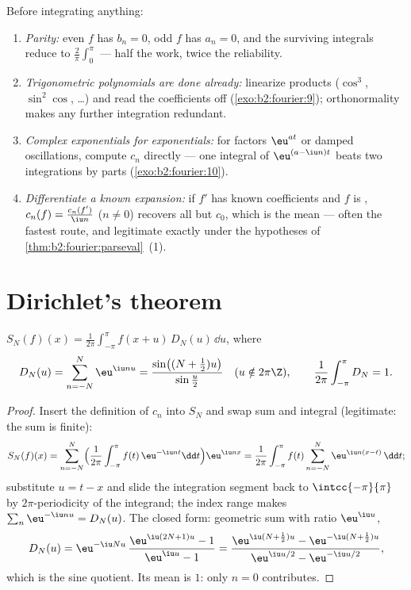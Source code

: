 \begin{method}\label{met:b2:fourier:coefficients}
Before integrating anything:
\begin{enumerate}
  \item \emph{Parity:} even $f$ has $b_n = 0$, odd $f$ has $a_n
        = 0$, and the surviving integrals reduce to $\frac2\pi
        \int_0^\pi$ --- half the work, twice the reliability.
  \item \emph{Trigonometric polynomials are done already:}
        linearize products ($\cos^3$, $\sin^2\cos$, \dots) and
        read the coefficients off
        (\cref{exo:b2:fourier:9}); orthonormality makes any
        further integration redundant.
  \item \emph{Complex exponentials for exponentials:} for
        factors $\eu^{at}$ or damped oscillations, compute
        $c_n$ directly --- one integral of $\eu^{(a - \iu
        n)t}$ beats two integrations by parts
        (\cref{exo:b2:fourier:10}).
  \item \emph{Differentiate a known expansion:} if $f' $ has
        known coefficients and $f$ is , $c_n(f) =
        \frac{c_n(f')}{\iu n}$ ($n \neq 0$) recovers all but
        $c_0$, which is the mean --- often the fastest route,
        and legitimate exactly under the hypotheses of
        \cref{thm:b2:fourier:parseval}~(1).
\end{enumerate}
\end{method}

\section{Dirichlet's theorem}

\begin{lemma}\label{lem:b2:fourier:kernel}
$S_N(f)(x) = \frac{1}{2\pi}\int_{-\pi}^{\pi} f(x + u)\,D_N(u)\,\dd
u$, where
\[
D_N(u) = \sum_{n=-N}^{N} \eu^{\iu nu}
= \frac{\sin\bigl((N + \frac12)u\bigr)}{\sin\frac u2}
\quad (u \notin 2\pi\Z),
\qquad
\frac{1}{2\pi}\int_{-\pi}^{\pi} D_N = 1 .
\]
\end{lemma}

\begin{proof}
Insert the definition of $c_n$ into $S_N$ and swap sum and integral
(legitimate: the sum is finite):
\[
S_N(f)(x)
= \sum_{n=-N}^{N}\Bigl(\frac{1}{2\pi}\int_{-\pi}^{\pi}
f(t)\,\eu^{-\iu nt}\dd t\Bigr)\eu^{\iu nx}
= \frac{1}{2\pi}\int_{-\pi}^{\pi} f(t)
\sum_{n=-N}^{N}\eu^{\iu n(x-t)}\,\dd t ;
\]
substitute $u = t - x$ and slide the integration segment back
to $\intcc{-\pi}{\pi}$ by $2\pi$-periodicity of the integrand;
the  index range makes $\sum_n\eu^{-\iu nu} = D_N(u)$.
The closed form: geometric sum with ratio $\eu^{\iu u}$,
\[
D_N(u) = \eu^{-\iu Nu}\,\frac{\eu^{\iu(2N+1)u} - 1}{\eu^{\iu u} -
1}
= \frac{\eu^{\iu(N + \frac12)u} - \eu^{-\iu(N+\frac12)u}}
{\eu^{\iu u/2} - \eu^{-\iu u/2}} ,
\]
which is the sine quotient. Its mean is $1$: only $n = 0$
contributes.
\end{proof}

